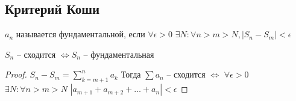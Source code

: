 \subsection{Критерий Коши}
\begin{definition}
    ${a_n}$ называется фундаментальной, если $\forall \epsilon > 0$  $\exists N: \forall n > m > N, |S_n - S_m| < \epsilon$
\end{definition}
\begin{theorem}
    ${S_n}$ -- сходится $\Leftrightarrow {S_n}$ -- фундаментальная
\end{theorem}
\begin{proof}
$S_n - S_m = \sum_{k = m + 1}^{n} a_{k}$
Тогда $\sum a_n$ -- сходится $\Leftrightarrow$ $\forall \epsilon > 0$  $\exists N: \forall n > m > N$
$|a_{m + 1} + a_{m + 2} + \dots + a_{n}| < \epsilon$
\end{proof}

